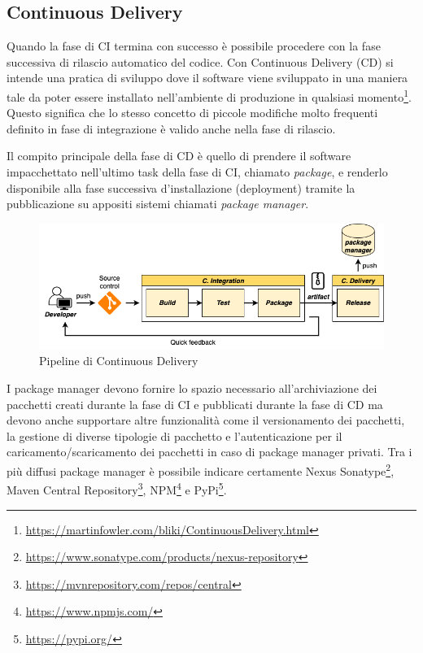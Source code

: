 \subsection{Continuous Delivery}
\label{cd-sec}
Quando la fase di CI termina con successo è possibile procedere con la fase successiva di rilascio automatico del codice. 
Con Continuous Delivery (CD) si intende una pratica di sviluppo dove il software viene sviluppato in una maniera tale da poter essere installato nell'ambiente di produzione in qualsiasi momento\footnote{\href{https://martinfowler.com/bliki/ContinuousDelivery.html}{https://martinfowler.com/bliki/ContinuousDelivery.html}}. 
Questo significa che lo stesso concetto di piccole modifiche molto frequenti definito in fase di integrazione è valido anche nella fase di rilascio.

Il compito principale della fase di CD è quello di prendere il software impacchettato nell'ultimo task della fase di CI, 
chiamato \textit{package}, e renderlo disponibile alla fase successiva d'installazione (deployment) tramite la pubblicazione su appositi sistemi chiamati \textit{package manager}.

\begin{figure}[H]
    \centering
    \includegraphics[width=1\textwidth]{img/cd-pipeline.png}
    \caption{Pipeline di Continuous Delivery}
    \label{cd-pipeline}
\end{figure}

I package manager devono fornire lo spazio necessario all'archiviazione dei pacchetti creati durante la fase di CI e pubblicati durante la fase di CD ma devono anche supportare altre funzionalità come il versionamento dei pacchetti, la gestione di diverse tipologie di pacchetto e l'autenticazione per il caricamento/scaricamento dei pacchetti in caso di package manager privati.
Tra i più diffusi package manager è possibile indicare certamente Nexus Sonatype\footnote{\href{https://www.sonatype.com/products/nexus-repository}{https://www.sonatype.com/products/nexus-repository}}, 
Maven Central Repository\footnote{\href{https://mvnrepository.com/repos/central}{https://mvnrepository.com/repos/central}},
NPM\footnote{\href{https://www.npmjs.com/}{https://www.npmjs.com/}} e PyPi\footnote{\href{https://pypi.org/}{https://pypi.org/}}.

